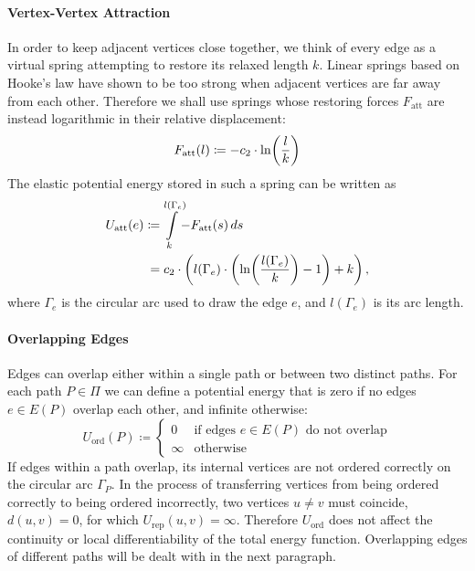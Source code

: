 \paragraph{Vertex-Vertex Attraction}

In order to keep adjacent vertices close together, we think of every edge as a virtual spring attempting to restore its relaxed length ${k}$. Linear springs based on Hooke's law have shown to be too strong when adjacent vertices are far away from each other. Therefore we shall use springs whose restoring forces ${F_\text{att}}$ are instead logarithmic in their relative displacement:
%
\begin{equation*}
  F_\text{att}(l) \coloneqq -c_2 \cdot {\ln}{\left({\frac{l}{k}}\right)}
\end{equation*}
%
The elastic potential energy stored in such a spring can be written as
%
\begin{align*}
  U_\text{att}(e) \coloneqq{}& \int\limits_{k}^{\mathclap{l(\Gamma_e)}} -F_\text{att}(s) \differential{s}
  \\
  ={}& c_2 \cdot \left( l(\Gamma_e) \cdot \left( \eval{\ln}{\frac{l(\Gamma_e)}{k}} - 1 \right) + k \right),
\end{align*}
%
where ${\Gamma_e}$ is the circular arc used to draw the edge ${e}$, and ${l(\Gamma_e)}$ is its arc length.





\paragraph{Overlapping Edges}

Edges can overlap either within a single path or between two distinct paths. For each path ${P \in \Pi}$ we can define a potential energy that is zero if no edges ${e \in E(P)}$ overlap each other, and infinite otherwise:
%
\begin{equation*}
  U_\text{ord}(P) \coloneqq \begin{cases}
    0 & \text{if edges ${e \in E(P)}$ do not overlap}
    \\
    \infty & \text{otherwise}
  \end{cases}
\end{equation*}
%
If edges within a path overlap, its internal vertices are not ordered correctly on the circular arc ${\Gamma_P}$. In the process of transferring vertices from being ordered correctly to being ordered incorrectly, two vertices ${u \neq v}$ must coincide, \ie{} ${d(u,v) = 0}$, for which ${U_\text{rep}(u,v) = \infty}$. Therefore ${U_\text{ord}}$ does not affect the continuity or local differentiability of the total energy function. Overlapping edges of different paths will be dealt with in the next paragraph.





